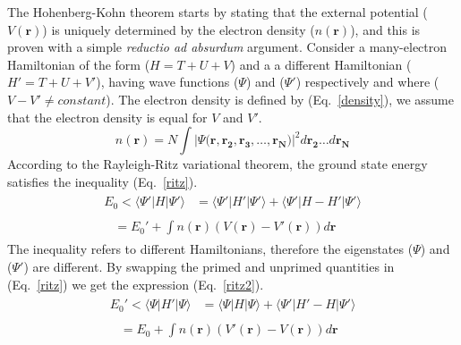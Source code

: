 The Hohenberg-Kohn theorem starts by stating that the external potential ($V(\mathbf{r})$) is uniquely determined by the electron density ($n(\mathbf{r})$), and this is proven with a simple \textit{reductio ad absurdum} argument. Consider a many-electron Hamiltonian of the form ($H = T + U + V$) and a a different Hamiltonian ($H' = T + U + V'$), having wave functions ($\Psi$) and ($\Psi '$) respectively and where ($V - V' \neq constant$). The electron density is defined by (Eq.~\ref{density}), we assume that the electron density is equal for $V$ and $V'$. 
%
\begin{equation} \label{density}
n(\mathbf{r}) = N \int | \Psi (\mathbf{r, r_2, r_3, \dots, r_N)}|^2 d \mathbf{r_2 \dots}d\mathbf{r_N}
\end{equation} 
%
According to the Rayleigh-Ritz variational theorem, the ground state energy satisfies the inequality (Eq.~\ref{ritz}).
%
\begin{subequations} \label{ritz}
\begin{align}
\begin{split}
E_0 < \langle \Psi'|H|\Psi'\rangle &= \langle \Psi'|H'|\Psi'\rangle + \langle \Psi'|H-H'|\Psi'\rangle
\end{split}\\
\begin{split}
&= E_0 ' + \int n(\mathbf{r}) (V(\mathbf{r}) - V'(\mathbf{r})) d \mathbf{r}
\end{split}
\end{align}
\end{subequations}
%
The inequality refers to different Hamiltonians, therefore the eigenstates ($\Psi$) and ($\Psi '$) are different. By swapping the primed and unprimed quantities in (Eq.~\ref{ritz}) we get the expression (Eq.~\ref{ritz2}).
%
\begin{subequations} \label{ritz2}
\begin{align}
\begin{split}
E_0' < \langle \Psi|H'|\Psi\rangle &= \langle \Psi|H|\Psi\rangle + \langle \Psi'|H'-H|\Psi'\rangle
\end{split}\\
\begin{split}
&= E_0 + \int n(\mathbf{r}) (V'(\mathbf{r}) - V(\mathbf{r})) d \mathbf{r}
\end{split}
\end{align}
\end{subequations}
